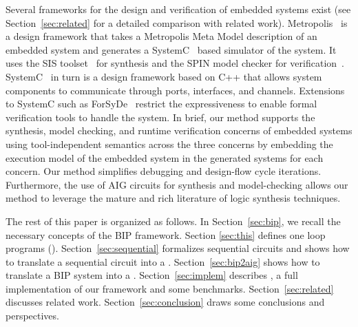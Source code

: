 
Several frameworks for the design and verification of embedded systems exist 
(see Section~\ref{sec:related} for a detailed comparison with related work).
%
Metropolis~\cite{metropolis1,metropolis2} is a design framework that
takes a Metropolis Meta Model description of an embedded system 
and generates a SystemC~\cite{systemc} based simulator of the system.
It uses the SIS toolset~\cite{brayton92sis} for synthesis and the SPIN model checker for verification~\cite{HolzSpin97}. 
SystemC~\cite{systemc} in turn is a design framework based on C++ that allows
system components to communicate through ports, interfaces, and channels.
Extensions to SystemC such as ForSyDe~\cite{SanderJ04} restrict the 
expressiveness to enable formal verification tools to handle the system. 
In brief, our method supports the synthesis, model checking, and runtime verification 
concerns of embedded systems using tool-independent semantics across the three concerns
by embedding the execution model of the embedded system in the generated systems 
for each concern. 
Our method simplifies debugging and design-flow cycle iterations. Furthermore, 
the use of AIG circuits for synthesis and model-checking allows our method to leverage
the mature and rich literature of logic synthesis techniques. 


The rest of this paper is organized as follows.
In Section~\ref{sec:bip}, we recall the necessary concepts of the BIP framework. Section \ref{sec:this} defines one loop programs (\caig).
Section~\ref{sec:sequential} formalizes sequential circuits and shows how to translate a sequential circuit into a \caig.
Section~\ref{sec:bip2aig} shows how to translate a BIP system into a \caig.
Section~\ref{sec:implem} describes \biptool{}, a full implementation of our framework and some benchmarks.
Section~\ref{sec:related} discusses related work.
Section~\ref{sec:conclusion} draws some conclusions and perspectives.
%
